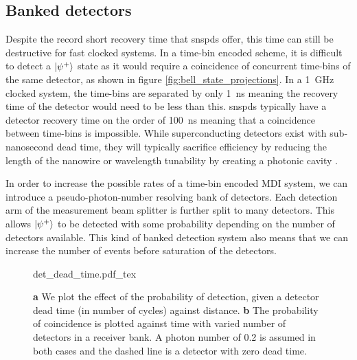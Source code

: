 
\subsection{Banked detectors}

Despite the record short recovery time that \acp{snspd} offer, this time can still be destructive for fast clocked systems. In a time-bin encoded scheme, it is difficult to detect a $\ket{\psi^+}$ state as it would require a coincidence of concurrent time-bins of the same detector, as shown in figure \ref{fig:bell_state_projections}. In a \SI{1}{GHz} clocked system, the time-bins are separated by only \SI{1}{\ns} meaning the recovery time of the detector would need to be less than this. \Acp{snspd} typically have a detector recovery time on the order of \SI{100}{\ns} meaning that a coincidence between time-bins is impossible. While superconducting detectors exist with sub-nanosecond dead time, they will typically sacrifice efficiency by reducing the length of the nanowire or wavelength tunability by creating a photonic cavity \cite{vetter2016, yun2019}.

In order to increase the possible rates of a time-bin encoded \ac{MDI} system, we can introduce a pseudo-photon-number resolving bank of detectors. Each detection arm of the measurement beam splitter is further split to many detectors. This allows $\ket{\psi^+}$ to be detected with some probability depending on the number of detectors available. This kind of banked detection system also means that we can increase the number of events before saturation of the detectors. 

\begin{figure}[tbp]
	\centering
	\tiny
	\def\svgwidth{\textwidth} 
	{det_dead_time.pdf_tex}
	\caption[Effect of detector dead time and banked detectors]{\textbf{a} We plot the effect of the probability of detection, given a detector dead time (in number of cycles) against distance. \textbf{b} The probability of coincidence is plotted against time with varied number of detectors in a receiver bank. A photon number of 0.2 is assumed in both cases and the dashed line is a detector with zero dead time. }
	\label{fig:det_eff_dead_time}
\end{figure}

